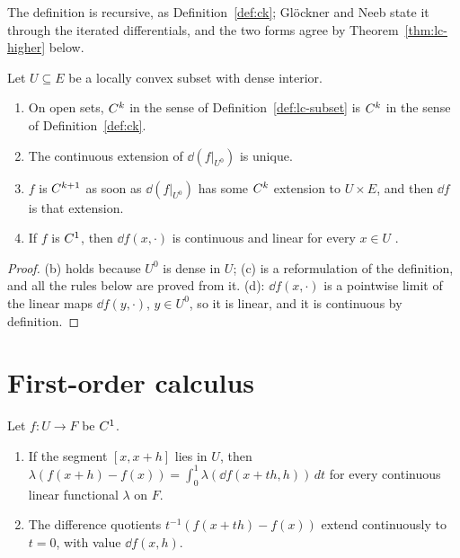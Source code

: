 The definition is recursive, as Definition~\ref{def:ck}; Glöckner and Neeb state it through the
iterated differentials, and the two forms agree by Theorem~\ref{thm:lc-higher} below.

\begin{proposition}
  \label{prop:lc-basic}
  \leanok
  Let $U \subseteq E$ be a locally convex subset with dense interior.
  \begin{enumerate}
    \item On open sets, $C^{k}$ in the sense of Definition~\ref{def:lc-subset} is $C^{k}$ in the
      sense of Definition~\ref{def:ck}.
    \item The continuous extension of $\dd(f|_{U^0})$ is unique.
    \item $f$ is $C^{k+1}$ as soon as $\dd(f|_{U^0})$ has some $C^{k}$ extension to $U \times E$,
      and then $\dd f$ is that extension.
    \item If $f$ is $C^{1}$, then $\dd f(x, \cdot)$ is continuous and linear for every $x \in U$
      \cite[Lemma~1.4.7]{GN26}.
  \end{enumerate}
\end{proposition}

\begin{proof}
  \leanok
  (b) holds because $U^0$ is dense in $U$; (c) is a reformulation of the definition, and all the
  rules below are proved from it. (d): $\dd f(x, \cdot)$ is a pointwise limit of the linear maps
  $\dd f(y, \cdot)$, $y \in U^0$, so it is linear, and it is continuous by definition.
\end{proof}

\section{First-order calculus}

\begin{theorem}
  \label{thm:lc-mean-value}
  \leanok
  Let $f \colon U \to F$ be $C^{1}$.
  \begin{enumerate}
    \item If the segment $[x, x + h]$ lies in $U$, then
      $\lambda(f(x + h) - f(x)) = \int_0^1 \lambda(\dd f(x + th, h))\, dt$ for every continuous
      linear functional $\lambda$ on $F$.
    \item The difference quotients $t^{-1}(f(x + th) - f(x))$ extend continuously to $t = 0$, with
      value $\dd f(x, h)$.
  \end{enumerate}
\end{theorem}

